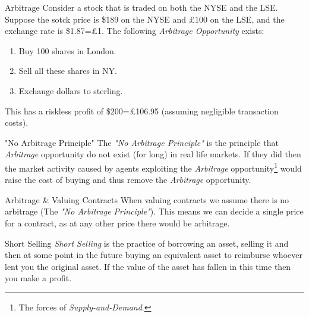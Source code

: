 \documentclass[11pt,a4paper]{article}
\begin{document}
  \begin{example}{Arbitrage}
    Consider a stock that is traded on both the NYSE and the LSE. Suppose the sotck price is \$189 on the NYSE and £100 on the LSE, and the exchange rate is \$1.87=£1. The following \textit{Arbitrage Opportunity} exists:
    \begin{enumerate}
      \item Buy 100 shares in London.
      \item Sell all these shares in NY.
      \item Exchange dollars to sterling.
    \end{enumerate}
    This has a riskless profit of \$200=£106.95 (assuming negligible transaction costs).
  \end{example}

  \begin{proposition}{"No Arbitrage Principle"}
    The \textit{"No Arbitrage Principle"} is the principle that \textit{Arbitrage} opportunity do not exist (for long) in real life markets. If they did then the market activity caused by agents exploiting the \textit{Arbitrage} opportunity\footnote{The forces of \textit{Supply-and-Demand}.} would raise the cost of buying and thus remove the \textit{Arbitrage} opportunity.
  \end{proposition}

  \begin{remark}{Arbitrage \& Valuing Contracts}
    When valuing contracts we assume there is no arbitrage (The \textit{"No Arbitrage Principle"}). This means we can decide a single price for a contract, as at any other price there would be arbitrage.
  \end{remark}

  \begin{definition}{Short Selling}
    \textit{Short Selling} is the practice of borrowing an asset, selling it and then at some point in the future buying an equivalent asset to reimburse whoever lent you the original asset. If the value of the asset has fallen in this time then you make a profit.
  \end{definition}
\end{document}

